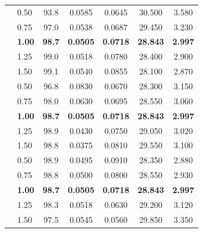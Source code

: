 \documentclass[11pt]{article}
\begin{document}
\begin{tcolorbox}[enhanced,breakable,colback=white,colframe=addblue!55,
coltext=addblue,fontupper=\color{addblue},boxrule=0.6pt,arc=2pt,
left=9pt,right=9pt,top=7pt,bottom=7pt]
{{\begin{tabular}{@{}llccccc@{}}
& 0.50          & 93.8          & 0.0585          & 0.0645          & 30.500          & 3.580 \\
& 0.75          & 97.0          & 0.0538          & 0.0687          & 29.450          & 3.230 \\
& \textbf{1.00} & \textbf{98.7} & \textbf{0.0505} & \textbf{0.0718} & \textbf{28.843} & \textbf{2.997} \\
& 1.25          & 99.0          & 0.0518          & 0.0780          & 28.400          & 2.900 \\
& 1.50          & 99.1          & 0.0540          & 0.0855          & 28.100          & 2.870 \\
\midrule

& 0.50          & 96.8          & 0.0830          & 0.0670          & 28.300          & 3.150 \\
& 0.75          & 98.0          & 0.0630          & 0.0695          & 28.550          & 3.060 \\
& \textbf{1.00} & \textbf{98.7} & \textbf{0.0505} & \textbf{0.0718} & \textbf{28.843} & \textbf{2.997} \\
& 1.25          & 98.9          & 0.0430          & 0.0750          & 29.050          & 3.020 \\
& 1.50          & 98.8          & 0.0375          & 0.0810          & 29.550          & 3.100 \\
\midrule

& 0.50          & 98.9          & 0.0495          & 0.0910          & 28.350          & 2.880 \\
& 0.75          & 98.8          & 0.0500          & 0.0800          & 28.550          & 2.930 \\
& \textbf{1.00} & \textbf{98.7} & \textbf{0.0505} & \textbf{0.0718} & \textbf{28.843} & \textbf{2.997} \\
& 1.25          & 98.3          & 0.0518          & 0.0630          & 29.200          & 3.120 \\
& 1.50          & 97.5          & 0.0545          & 0.0560          & 29.850          & 3.350 \\
\bottomrule
\end{tabular}
}
\par}
\end{tcolorbox}
\end{document}

